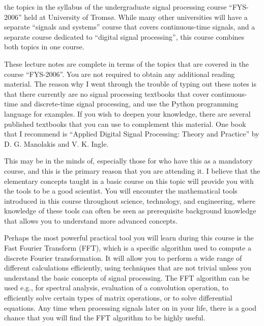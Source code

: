  the topics in the syllabus of the
undergraduate signal processing course ``FYS-2006'' held at University
of Troms\o{}. While many other universities will have a separate
``signals and systems'' course that covers continuous-time signals,
and a separate course dedicated to ``digital signal processing'', this
course combines both topics in one course.

These lecture notes are complete in terms of the topics that are
covered in the course ``FYS-2006''. You are not required to obtain any
additional reading material. The reason why I went through the trouble
of typing out these notes is that there currently are no signal
processing textbooks that cover continuous-time and discrete-time
signal processing, and use the Python programming language for
examples. If you wish to deepen your knowledge, there are several
published textbooks that you can use to complement this material. One
book that I recommend is ``Applied Digital Signal Processing: Theory
and Practice'' by D. G. Manolakis and V. K. Ingle.




 This may be in the minds of, especially those for who have this as a mandatory course, and this is the primary reason that you are attending it. I believe that the elementary concepts taught in a basic course on this topic will provide you with the tools to be a good scientist. You will encounter the mathematical tools introduced in this course throughout science, technology, and engineering, where knowledge of these tools can often be seen as prerequisite background knowledge that allows you to understand more advanced concepts.

Perhaps the most powerful practical tool you will learn during this course is the Fast Fourier Transform (FFT), which is a specific algorithm used to compute a discrete Fourier transformation. It will allow you to perform a wide range of different calculations efficiently, using techniques that are not trivial unless you understand the basic concepts of signal processing. The FFT algorithm can be used e.g., for spectral analysis, evaluation of a convolution operation, to efficiently solve certain types of matrix operations, or to solve differential equations. Any time when processing signals
later on in your life, there is a good chance that you will find the FFT algorithm to be highly useful.


